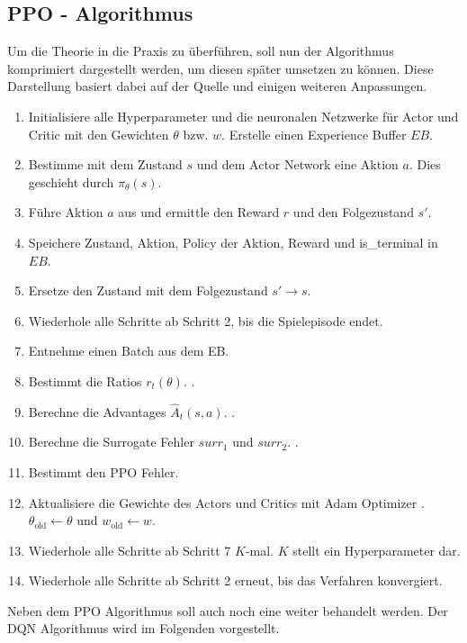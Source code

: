 \subsection{PPO - Algorithmus} \label{subsec:Grundlagen_PPO_Algorithmus}
Um die Theorie in die Praxis zu überführen, soll nun der Algorithmus komprimiert dargestellt werden, um diesen später umsetzen zu können. 
Diese Darstellung basiert dabei auf der Quelle \citep{PPO} und einigen weiteren Anpassungen.
\begin{enumerate}
	\item Initialisiere alle Hyperparameter und die neuronalen Netzwerke für Actor und Critic mit den Gewichten $\theta$ bzw. $w$. Erstelle einen Experience Buffer $EB$.
	\item Bestimme mit dem Zustand $s$ und dem Actor Network eine Aktion $a$. Dies geschieht durch $\pi_{\theta}(s)$.
	\item Führe Aktion $a$ aus und ermittle den Reward $r$ und den Folgezustand $s'$.
	\item Speichere Zustand, Aktion, Policy der Aktion, Reward und is\_terminal in $EB$.
	\item Ersetze den Zustand mit dem Folgezustand $s' \longrightarrow s$.
	\item Wiederhole alle Schritte ab Schritt 2, bis die Spielepisode endet.
	\item Entnehme einen Batch aus dem EB.
	\item Bestimmt die Ratios $r_t(\theta)$. .
	\item Berechne die Advantages $\hat{A}_{t}(s, a)$. .
	\item Berechne die Surrogate Fehler $surr_1$ und $surr_2$. .
	\item Bestimmt den PPO Fehler. 
	\item Aktualisiere die Gewichte des Actors und Critics mit Adam Optimizer \citep{PPO}. $\theta_{\text{old}} \longleftarrow \theta$ und $w_{\text{old}} \longleftarrow w$.
	\item Wiederhole alle Schritte ab Schritt 7 $K$-mal. $K$ stellt ein Hyperparameter dar.
	\item Wiederhole alle Schritte ab Schritt 2 erneut, bis das Verfahren konvergiert.
\end{enumerate}
Neben dem PPO Algorithmus soll auch noch eine weiter behandelt werden. Der DQN Algorithmus wird im Folgenden vorgestellt.

